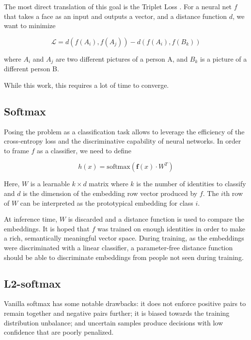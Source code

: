 The most direct translation of this goal is the Triplet Loss \citep{triplet-face,tripletloss,triplet}. For a neural net $f$ that takes a face as an input and outputs a vector, and a distance function $d$, we want to minimize

\begin{equation}
    \mathcal{L} = d(f(A_i), f(A_j)) - d(f(A_i), f(B_k))
\end{equation}

where $A_i$ and $A_j$ are two different pictures of a person A, and $B_k$ is a picture of a different person B.

While this work, this requires a lot of time to converge.

\subsection{Softmax}

Posing the problem as a classification task allows to leverage the efficiency of the cross-entropy loss and the discriminative capability of neural networks. In order to frame $f$ as a classifier, we need to define

\begin{equation}
    h(x) = \text{softmax}(\mathbf{f}(x) \cdot W^T)
\end{equation}

Here, $W$ is a learnable $k\times d$ matrix where $k$ is the number of identities to classify and $d$ is the dimension of the embedding row vector produced by $f$. The $i$th row of $W$ can be interpreted as the prototypical embedding for class $i$.

At inference time, $W$ is discarded and a distance function is used to compare the embeddings. It is hoped that $f$ was trained on enough identities in order to make a rich, semantically meaningful vector space. During training, as the embeddings were discriminated with a linear classifier, a parameter-free distance function should be able to discriminate embeddings from people not seen during training.

\subsection{L2-softmax}
\newcommand{\vnorm}[1]{\langle #1 \rangle}

Vanilla softmax has some notable drawbacks: it does not enforce positive pairs to remain together and negative pairs further; it is biased towards the training distribution unbalance; and uncertain samples produce decisions with low confidence that are poorly penalized.

